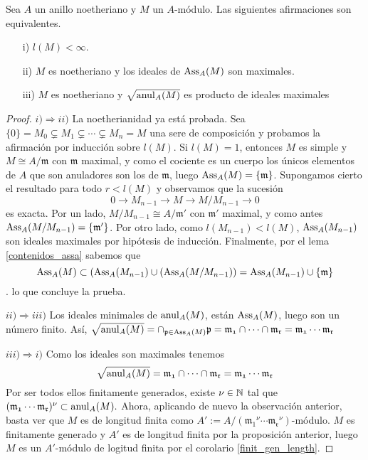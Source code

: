\documentclass[../main.tex]{subfiles}
\begin{document}
\begin{proposition}Sea $A$ un anillo noetheriano y $M$ un $A$-módulo. Las siguientes afirmaciones son equivalentes.
\begin{itemize}
    \item[i)] $l(M)<\infty$.
    \item[ii)] $M$ es noetheriano y los ideales de $\text{Ass}_A(M)$ son maximales.
    \item[iii)] $M$ es noetheriano y $\sqrt{\operatorname{anul}_A(M)}$ es producto de ideales maximales
\end{itemize}
\end{proposition}
\begin{proof}
$i)\Rightarrow ii)$ La noetherianidad ya está probada. Sea $\{0\}=M_0\subsetneq M_1\subsetneq\cdots\subsetneq M_n=M$ una sere de composición y probamos la afirmación por inducción sobre $l(M)$. Si $l(M) = 1$, entonces $M$ es simple y $M\cong A/\mathfrak{m}$ con $\mathfrak{m}$ maximal, y como el cociente es un cuerpo los únicos elementos de $A$ que son anuladores son los de $\mathfrak{m}$, luego $\text{Ass}_A(M) = \{\mathfrak{m}\}$. Supongamos cierto el resultado para todo $r < l(M)$ y observamos que la sucesión
$$0\rightarrow M_{n-1}\rightarrow M\rightarrow M/M_{n-1}\rightarrow 0$$
es exacta. Por un lado, $M/M_{n-1}\cong A/\mathfrak{m'}$ con $\mathfrak{m'}$ maximal, y como antes $\text{Ass}_A(M/M_{n-1}) = \{\mathfrak{m}'\}$. Por otro lado, como $l(M_{n-1})<l(M)$, $\text{Ass}_A(M_{n-1})$ son ideales maximales por hipótesis de inducción. Finalmente, por el lema \ref{contenidos_assa} sabemos que
$$\text{Ass}_A(M)\subset \left ( \text{Ass}_A(M_{n-1})\cup(\text{Ass}_A(M/M_{n-1}) \right)=\text{Ass}_A(M_{n-1})\cup\{\mathfrak{m}\} $$.
lo que concluye la prueba.

$ii)\Rightarrow iii)$ Los ideales minimales de $\operatorname{anul}_A(M)$, están $\text{Ass}_A(M)$, luego son un número finito. Así, $\sqrt{\operatorname{anul}_A(M)}=\cap_{\mathfrak{p}\in\text{Ass}_A(M)}\mathfrak{p}=\mathfrak{m_1}\cap\cdots\cap\mathfrak{m_r}=\mathfrak{m_1}\cdots\mathfrak{m_r}$

$iii)\Rightarrow i)$ Como los ideales son maximales tenemos
$$\sqrt{\operatorname{anul}_A(M)}=\mathfrak{m_1}\cap\cdots\cap\mathfrak{m_r}=\mathfrak{m_1}\cdots\mathfrak{m_r}$$
Por ser todos ellos finitamente generados, existe $\nu\in\mathbb{N}$ tal que $(\mathfrak{m_1}\cdots\mathfrak{m_r})^\nu\subset\operatorname{anul}_A(M).$ Ahora, aplicando de nuevo la observación anterior, basta ver que $M$ es de longitud finita como $A':=A/(\mathfrak{m_1}^\nu\cdots\mathfrak{m_r}^\nu)$-módulo. $M$ es finitamente generado y $A'$ es de longitud finita por la proposición anterior, luego $M$ es un $A'$-módulo de logitud finita por el corolario \ref{finit_gen_length}.
\end{proof}
\end{document}
